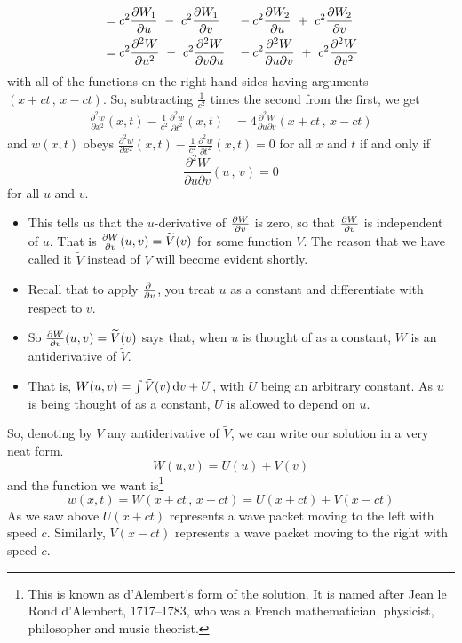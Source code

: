 \begin{eg}
\begin{alignat*}{3}
&=c^2\pdiff{W_1}{u}  
     \ -\  c^2\pdiff{W_1}{v}
   && -c^2\pdiff{W_2}{u}
     \ +\  c^2\pdiff{W_2}{v}  \\
&=c^2\frac{\partial^2 W}{\partial u^2}  
     \ -\  c^2\frac{\partial^2 W}{\partial v\partial u}
    && - c^2\frac{\partial^2 W}{\partial u\partial v}
     \ +\  c^2\frac{\partial^2 W}{\partial v^2}  
\end{alignat*}
with all of the functions on the right hand sides having arguments
$(x+ct\,,\,x-ct)$. So, subtracting $\frac{1}{c^2}$ times the second from the
first, we get
\begin{align*}
\frac{\partial^2 w}{\partial x^2}(x,t)
         -\frac{1}{c^2}\frac{\partial^2 w}{\partial t^2}(x,t)
&=4 \frac{\partial^2 W}{\partial u\partial v}(x+ct\,,\,x-ct)
\end{align*}
and $w(x,t)$ obeys $\frac{\partial^2 w}{\partial x^2}(x,t)
         -\frac{1}{c^2}\frac{\partial^2 w}{\partial t^2}(x,t)=0$
for all $x$ and $t$ if and only if 
\begin{equation*}
\frac{\partial^2 W}{\partial u\partial v}(u\,,\,v)=0
\end{equation*}
for all $u$ and $v$. 

\begin{itemize}
\item
This tells us that the $u$-derivative of $\pdiff{W}{v}$ is zero, 
so that $\pdiff{W}{v}$ is independent of $u$.
That is $\pdiff{W}{v}(u,v) = \widetilde V(v)$ for some function $\tilde V$.
The reason that we have called it $\widetilde V$ instead of $V$ will become
evident shortly.
\item
Recall that to apply $\pdiff{}{v}$, you treat $u$ as a constant
and differentiate with respect to $v$. 
\item 
So $\pdiff{W}{v}(u,v) = \widetilde V(v)$ says that, when $u$ is thought 
of as a constant, $W$ is an antiderivative of $\widetilde V$. 
\item
That is, $W(u,v) = \int \tilde V(v)\,\mathrm{d}v +U$,
with $U$ being an arbitrary constant. As $u$ is being thought of as 
a constant, $U$ is allowed to depend on $u$. 
\end{itemize}\noindent
So, denoting by $V$ any antiderivative of $\tilde V$, we can write
our solution in a very neat form.
\begin{equation*}
W(u,v) = U(u) + V(v)
\end{equation*}
and the function we want is\footnote{This is known as d'Alembert's form
of the solution. It is named after Jean le Rond d'Alembert, 1717--1783,
who was a French mathematician, physicist, philosopher and music
theorist.}
\begin{equation*}
w(x,t) = W(x+ct\,,\,x-ct)
       = U(x+ct) + V(x-ct)
\end{equation*}
As we saw above $U(x+ct)$ represents a wave packet moving to the 
left with speed $c$. Similarly, $V(x-ct)$ represents a wave packet 
moving to the right with speed $c$.


\end{eg}
